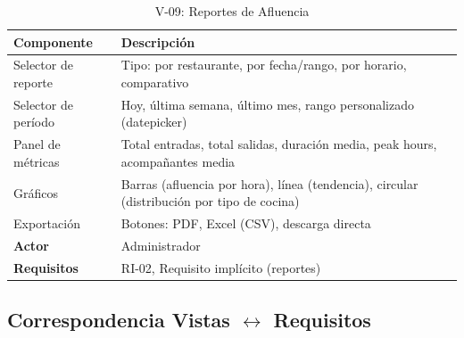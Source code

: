 \begin{table}[H]
    \centering
    \caption{V-09: Reportes de Afluencia}
    \label{tab:vista09}
    \begin{tabular}{|>{\raggedright\arraybackslash}p{}|>{\raggedright\arraybackslash}p{}|}
        \hline
        \textbf{Componente} & \textbf{Descripción} \\
        \hline
        Selector de reporte & Tipo: por restaurante, por fecha/rango, por horario, comparativo \\
        \hline
        Selector de período & Hoy, última semana, último mes, rango personalizado (datepicker) \\
        \hline
        Panel de métricas & Total entradas, total salidas, duración media, peak hours, acompañantes media \\
        \hline
        Gráficos & Barras (afluencia por hora), línea (tendencia), circular (distribución por tipo de cocina) \\
        \hline
        Exportación & Botones: PDF, Excel (CSV), descarga directa \\
        \hline
        \textbf{Actor} & Administrador \\
        \hline
        \textbf{Requisitos} & RI-02, Requisito implícito (reportes) \\
        \hline
    \end{tabular}
\end{table}

\subsection{Correspondencia Vistas $\leftrightarrow$ Requisitos}

